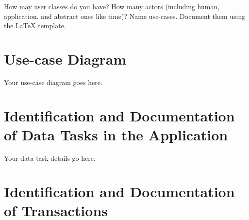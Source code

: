 \documentclass[11pt]{article}
\begin{document}


How may user classes do you have? How many actors (including human, application, and abstract ones like time)? Name use-cases. Document them using the \LaTeX{} template.




\section{Use-case Diagram} \label{sec:use-case-diagram}


Your use-case diagram goes here.



\section{Identification and Documentation of Data Tasks in the Application} \label{sec:tasks}


Your data task details go here.




\section{Identification and Documentation of Transactions} \label{sec:transactions}
\end{document}
